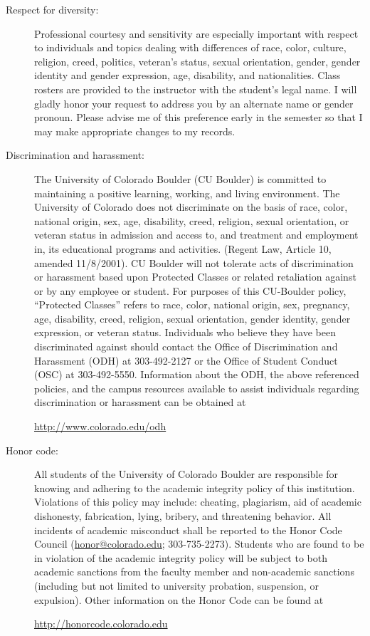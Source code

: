 \documentclass[11pt]{article}
\begin{document}
\begin{description}
\item[Respect for diversity:] Professional courtesy and sensitivity
  are especially important with respect to individuals and topics
  dealing with differences of race, color, culture, religion, creed,
  politics, veteran's status, sexual orientation, gender, gender
  identity and gender expression, age, disability, and nationalities.
  Class rosters are provided to the instructor with the student's
  legal name. I will gladly honor your request to address you by an
  alternate name or gender pronoun. Please advise me of this
  preference early in the semester so that I may make appropriate
  changes to my records.

\item[Discrimination and harassment:] The University of Colorado
  Boulder (CU Boulder) is committed to maintaining a positive
  learning, working, and living environment. The University of
  Colorado does not discriminate on the basis of race, color, national
  origin, sex, age, disability, creed, religion, sexual orientation,
  or veteran status in admission and access to, and treatment and
  employment in, its educational programs and activities. (Regent Law,
  Article 10, amended 11/8/2001).  CU Boulder will not tolerate acts
  of discrimination or harassment based upon Protected Classes or
  related retaliation against or by any employee or student. For
  purposes of this CU-Boulder policy, ``Protected Classes'' refers to
  race, color, national origin, sex, pregnancy, age, disability,
  creed, religion, sexual orientation, gender identity, gender
  expression, or veteran status.  Individuals who believe they have
  been discriminated against should contact the Office of
  Discrimination and Harassment (ODH) at 303-492-2127 or the Office of
  Student Conduct (OSC) at 303-492-5550.  Information about the ODH,
  the above referenced policies, and the campus resources available to
  assist individuals regarding discrimination or harassment can be
  obtained at
  \begin{center}
    \url{http://www.colorado.edu/odh}
  \end{center}

\item[Honor code:] All students of the University of Colorado Boulder
  are responsible for knowing and adhering to the academic integrity
  policy of this institution.  Violations of this policy may include:
  cheating, plagiarism, aid of academic dishonesty, fabrication,
  lying, bribery, and threatening behavior.  All incidents of academic
  misconduct shall be reported to the Honor Code Council
  (\href{mailto:honor@colorado.edu}{honor@colorado.edu};
  303-735-2273). Students who are found to be in violation of the
  academic integrity policy will be subject to both academic sanctions
  from the faculty member and non-academic sanctions (including but
  not limited to university probation, suspension, or
  expulsion). Other information on the Honor Code can be found at
  \begin{center}
    \url{http://honorcode.colorado.edu}
  \end{center}
\end{description}
\end{document}
